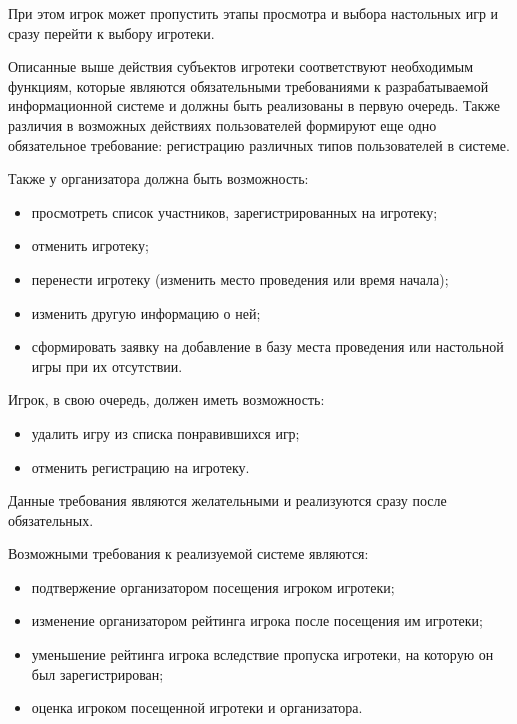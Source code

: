 При этом игрок может пропустить этапы просмотра и выбора настольных игр и
сразу перейти к выбору игротеки.

Описанные выше действия субъектов игротеки соответствуют необходимым функциям,
которые являются обязательными требованиями к разрабатываемой информационной
системе и должны быть реализованы в первую очередь. Также различия в возможных
действиях пользователей формируют еще одно обязательное требование: регистрацию
различных типов пользователей в системе.

Также у организатора должна быть возможность:
\begin{itemize}
    \item просмотреть список участников, зарегистрированных на игротеку;
    \item отменить игротеку;
    \item перенести игротеку (изменить место проведения или время начала);
    \item изменить другую информацию о ней;
    \item сформировать заявку на добавление в базу места проведения или
        настольной игры при их отсутствии.
\end{itemize}

\clearpage
Игрок, в свою очередь, должен иметь возможность:
\begin{itemize}
    \item удалить игру из списка понравившихся игр;
    \item отменить регистрацию на игротеку.
\end{itemize}

Данные требования являются желательными и реализуются сразу после обязательных.
 
Возможными требования к реализуемой системе являются:
\begin{itemize}
    \item подтвержение организатором посещения игроком игротеки;
    \item изменение организатором рейтинга игрока после посещения им игротеки;
    \item уменьшение рейтинга игрока вследствие пропуска игротеки, на которую он
        был зарегистрирован;
    \item оценка игроком посещенной игротеки и организатора.
\end{itemize}

